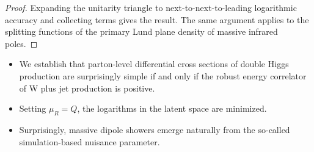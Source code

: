 \begin{proof}
Expanding the unitarity triangle to next-to-next-to-leading logarithmic
accuracy and collecting terms gives the result. The same argument
applies to the splitting functions of the primary Lund plane density of
massive infrared poles.
\end{proof}

\begin{itemize}
  \item We establish that parton-level differential cross sections of double Higgs production are surprisingly simple if and only if the robust energy correlator of W plus jet production is positive.
  \item Setting $\mu_R = Q$, the logarithms in the latent space are minimized.
  \item Surprisingly, massive dipole showers emerge naturally from the so-called simulation-based nuisance parameter.
\end{itemize}

